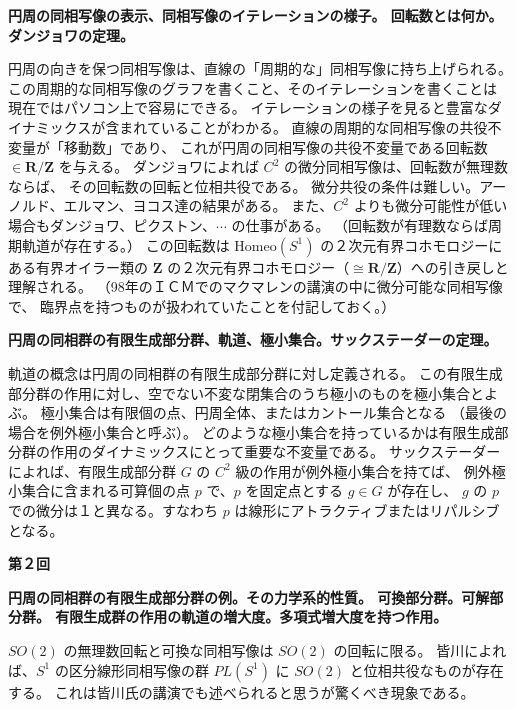 \documentclass[uplatex,dvipdfmx]{jlreq}
\begin{document}
\medskip
\noindent
\textbf{円周の同相写像の表示、同相写像のイテレーションの様子。
回転数とは何か。ダンジョワの定理。}

\medskip

円周の向きを保つ同相写像は、直線の「周期的な」同相写像に持ち上げられる。
この周期的な同相写像のグラフを書くこと、そのイテレーションを書くことは
現在ではパソコン上で容易にできる。
イテレーションの様子を見ると豊富なダイナミックスが含まれていることがわかる。
直線の周期的な同相写像の共役不変量が「移動数」であり、
これが円周の同相写像の共役不変量である回転数 $\in \mathbf{R}/\mathbf{Z}$ を与える。
ダンジョワによれば $C^2$ の微分同相写像は、回転数が無理数ならば、
その回転数の回転と位相共役である。
微分共役の条件は難しい。アーノルド、エルマン、ヨコス達の結果がある。
また、$C^2$ よりも微分可能性が低い場合もダンジョワ、ピクストン、$\cdots$ の仕事がある。
（回転数が有理数ならば周期軌道が存在する。）
この回転数は $\mathrm{Homeo}(S^1)$ の２次元有界コホモロジーにある有界オイラー類の
$\mathbf{Z}$ の２次元有界コホモロジー（$\cong \mathbf{R}/\mathbf{Z}$）への引き戻しと理解される。
（98年のＩＣＭでのマクマレンの講演の中に微分可能な同相写像で、
臨界点を持つものが扱われていたことを付記しておく。）

\medskip
\noindent
\textbf{円周の同相群の有限生成部分群、軌道、極小集合。サックステーダーの定理。}

\medskip

軌道の概念は円周の同相群の有限生成部分群に対し定義される。
この有限生成部分群の作用に対し、空でない不変な閉集合のうち極小のものを極小集合とよぶ。
極小集合は有限個の点、円周全体、またはカントール集合となる
（最後の場合を例外極小集合と呼ぶ）。
どのような極小集合を持っているかは有限生成部分群の作用のダイナミックスにとって重要な不変量である。
サックステーダーによれば、有限生成部分群 $G$ の $C^2$ 級の作用が例外極小集合を持てば、
例外極小集合に含まれる可算個の点 $p$ で、$p$ を固定点とする $g \in G$ が存在し、
$g$ の $p$ での微分は１と異なる。すなわち $p$ は線形にアトラクティブまたはリパルシブとなる。

\bigskip
\noindent
{\large\textbf{第２回}}

\medskip
\noindent
\textbf{円周の同相群の有限生成部分群の例。その力学系的性質。
可換部分群。可解部分群。
有限生成群の作用の軌道の増大度。多項式増大度を持つ作用。}

\medskip

$SO(2)$ の無理数回転と可換な同相写像は $SO(2)$ の回転に限る。
皆川によれば、$S^1$ の区分線形同相写像の群 $PL(S^1)$ に
$SO(2)$ と位相共役なものが存在する。
これは皆川氏の講演でも述べられると思うが驚くべき現象である。
\end{document}
